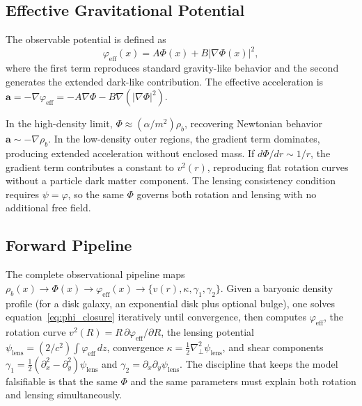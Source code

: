 \documentclass[11pt, a4paper, twocolumn]{article}
\begin{document}
\subsection{Effective Gravitational Potential}

The observable potential is defined as
\[
\varphi_{\mathrm{eff}}(x)
=
A\Phi(x)
+
B|\nabla\Phi(x)|^2,
\]
where the first term reproduces standard gravity-like behavior and the second
generates the extended dark-like contribution. The effective acceleration is
$\mathbf{a} = -\nabla\varphi_{\mathrm{eff}} = -A\nabla\Phi - B\nabla(|\nabla\Phi|^2)$.

In the high-density limit, $\Phi \approx (\alpha/m^2)\rho_b$, recovering
Newtonian behavior $\mathbf{a} \sim -\nabla\rho_b$. In the low-density outer
regions, the gradient term dominates, producing extended acceleration without
enclosed mass. If $d\Phi/dr \sim 1/r$, the gradient term contributes a constant
to $v^2(r)$, reproducing flat rotation curves without a particle dark matter
component. The lensing consistency condition requires $\psi = \varphi$, so the
same $\Phi$ governs both rotation and lensing with no additional free field.

\subsection{Forward Pipeline}

The complete observational pipeline maps
$\rho_b(x) \to \Phi(x) \to \varphi_{\mathrm{eff}}(x) \to \{v(r),\kappa,\gamma_1,\gamma_2\}$.
Given a baryonic density profile (for a disk galaxy, an exponential disk plus
optional bulge), one solves equation~\eqref{eq:phi_closure} iteratively until
convergence, then computes $\varphi_{\mathrm{eff}}$, the rotation curve
$v^2(R) = R\,\partial\varphi_{\mathrm{eff}}/\partial R$, the lensing potential
$\psi_{\mathrm{lens}} = (2/c^2)\int\varphi_{\mathrm{eff}}\,dz$, convergence
$\kappa = \frac{1}{2}\nabla_\perp^2\psi_{\mathrm{lens}}$, and shear components
$\gamma_1 = \frac{1}{2}(\partial_x^2 - \partial_y^2)\psi_{\mathrm{lens}}$ and
$\gamma_2 = \partial_x\partial_y\psi_{\mathrm{lens}}$. The discipline that keeps
the model falsifiable is that the same $\Phi$ and the same parameters must
explain both rotation and lensing simultaneously.
\end{document}
